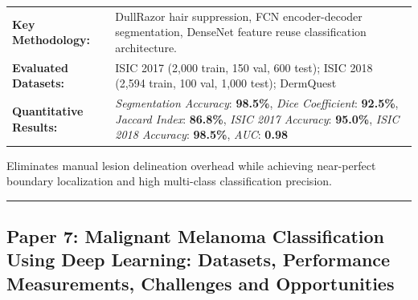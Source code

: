 \documentclass[10pt,a4paper]{article}
\begin{document}
\vspace{4pt}
\begin{tabularx}{\linewidth}{p{3.2cm}X}
\toprule
\textbf{Key Methodology:} & DullRazor hair suppression, FCN encoder-decoder segmentation, DenseNet feature reuse classification architecture. \\
\textbf{Evaluated Datasets:} & ISIC 2017 (2,000 train, 150 val, 600 test); ISIC 2018 (2,594 train, 100 val, 1,000 test); DermQuest \\
\textbf{Quantitative Results:} & \textit{Segmentation Accuracy}: \textbf{98.5\%}, \textit{Dice Coefficient}: \textbf{92.5\%}, \textit{Jaccard Index}: \textbf{86.8\%}, \textit{ISIC 2017 Accuracy}: \textbf{95.0\%}, \textit{ISIC 2018 Accuracy}: \textbf{98.5\%}, \textit{AUC}: \textbf{0.98} \\
\bottomrule
\end{tabularx}
\vspace{4pt}
\begin{tcolorbox}[utilitybox,title=Clinical Utility and Real-World Impact]
Eliminates manual lesion delineation overhead while achieving near-perfect boundary localization and high multi-class classification precision.
\end{tcolorbox}
\vspace{12pt}
\hrule
\vspace{12pt}
\subsection*{Paper 7: Malignant Melanoma Classification Using Deep Learning: Datasets, Performance Measurements, Challenges and Opportunities}
\end{document}
